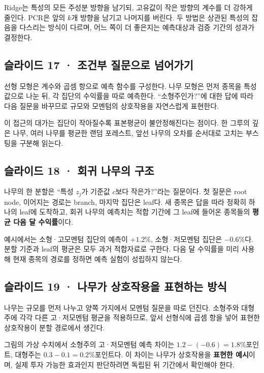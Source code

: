 \documentclass[11pt,a4paper]{article}
\begin{document}
Ridge는 특성의 모든 주성분 방향을 남기되, 고유값이 작은 방향의 계수를 더 강하게 줄인다. PCR은 앞의 $k$개 방향을 남기고 나머지를 버린다. 두 방법은 상관된 특성의 잡음을 다스리는 방식이 다르며, 어느 쪽이 더 좋은지는 예측대상과 검증 기간의 성과가 결정한다.\par

\subsection{슬라이드 17 · 조건부 질문으로 넘어가기}
선형 모형은 계수와 곱셈 항으로 예측 함수를 구성한다. 나무 모형은 먼저 종목을 특성값으로 나눈 뒤, 각 집단의 수익률을 따로 예측한다. “소형주인가?”에 대한 답에 따라 다음 질문을 바꾸므로 규모와 모멘텀의 상호작용을 자연스럽게 표현한다.\par

이 접근의 대가는 집단이 작아질수록 표본평균이 불안정해진다는 점이다. 한 그루의 깊은 나무, 여러 나무를 평균한 랜덤 포레스트, 앞선 나무의 오차를 순서대로 고치는 부스팅을 구분해 읽는다.\par

\subsection{슬라이드 18 · 회귀 나무의 구조}
나무의 한 분할은 “특성 $z_j$가 기준값 $c$보다 작은가?”라는 질문이다. 첫 질문은 root node, 이어지는 경로는 branch, 마지막 집단은 leaf다. 새 종목은 답을 따라 정확히 하나의 leaf에 도착하고, 회귀 나무의 예측치는 적합 기간에 그 leaf에 들어온 종목들의 \textbf{평균 다음 달 수익률}이다.\par

예시에서는 소형·고모멘텀 집단의 예측이 $+1.2\%$, 소형·저모멘텀 집단은 $-0.6\%$다. 분할 기준과 leaf의 평균은 모두 과거 적합자료로 구한다. 다음 달 수익률을 미리 사용해 현재 종목의 경로를 정하면 예측 실험이 성립하지 않는다.\par

\subsection{슬라이드 19 · 나무가 상호작용을 표현하는 방식}
나무는 규모를 먼저 나누고 양쪽 가지에서 모멘텀 질문을 따로 던진다. 소형주와 대형주에 각각 다른 고·저모멘텀 평균을 적용하므로, 앞서 선형식에 곱셈 항을 넣어 표현한 상호작용이 분할 경로에서 생긴다.\par

그림의 가상 수치에서 소형주의 고·저모멘텀 예측 차이는 $1.2-(-0.6)=1.8\%$포인트, 대형주는 $0.3-0.1=0.2\%$포인트다. 이 차이는 나무가 상호작용을 \textbf{표현한 예시}이며, 실제 투자 가능한 효과인지 판단하려면 독립된 뒤 기간에서 확인해야 한다.\par
\end{document}
